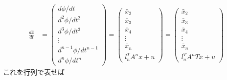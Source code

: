 \begin{align}
	\frac{d \bar{x}}{dt}
	& =
	\left(\begin{array}{c}
	     d \phi /dt \\
	     d^2 \phi /dt^2 \\
	     d^3 \phi /dt^3 \\
		 \vdots \\
	     d^{n-1} \phi /dt^{n-1} \\
	     d^{n} \phi /dt^{n}
	\end{array}\right)
	=
	\left(\begin{array}{c}
	     \bar{x}_2 \\
	     \bar{x}_3 \\
	     \bar{x}_4 \\
		 \vdots \\
	     \bar{x}_{n} \\
	     l_n^T A^{n} x + u
	\end{array}\right)
	=
	\left(\begin{array}{c}
	     \bar{x}_2 \\
	     \bar{x}_3 \\
	     \bar{x}_4 \\
		 \vdots \\
	     \bar{x}_{n} \\
	     l_n^T A^{n} T \bar{x} + u
	\end{array}\right)
\end{align}
これを行列で表せば
